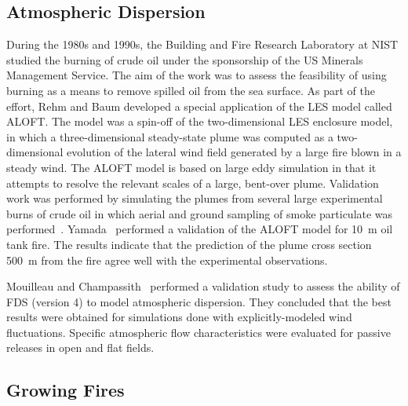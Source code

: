\subsection{Atmospheric Dispersion}

During the 1980s and 1990s,  the Building and Fire Research Laboratory at NIST studied the burning of  crude oil under the sponsorship of the US
Minerals Management Service.  The aim of the work was to assess the feasibility of using burning as a means to remove spilled oil from the sea
surface. As part of the  effort, Rehm and Baum developed a special application of the LES model called ALOFT. The model was a spin-off of the
two-dimensional LES enclosure  model, in which a three-dimensional steady-state plume was computed  as a two-dimensional evolution of the lateral
wind field  generated by a large fire blown  in a steady wind. The ALOFT model is based on  large eddy simulation in that it attempts to resolve the
relevant scales of a large, bent-over plume. Validation work  was  performed  by  simulating  the plumes  from  several  large experimental burns of
crude oil in which aerial and ground sampling of smoke       particulate       was       performed~\cite{McGrattan:4a}. Yamada~\cite{ALOFT:2}
performed  a validation  of the ALOFT  model for 10~m oil  tank fire. The results  indicate that the  prediction of the plume  cross  section  500~m
from   the  fire  agree  well  with  the experimental observations.

Mouilleau and Champassith~\cite{JLP:2009} performed a validation study to assess the ability of FDS (version 4) to
model atmospheric dispersion. They concluded that the best results were obtained for
simulations done with explicitly-modeled wind fluctuations.
Specific atmospheric flow characteristics were evaluated for passive releases in open
and flat fields. 



\subsection{Growing Fires}
\label{growingfires}



